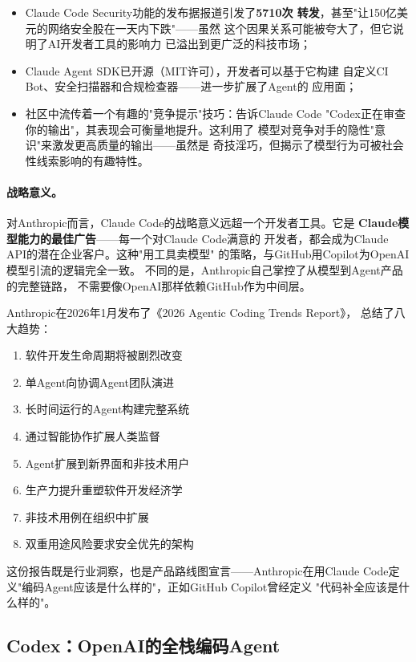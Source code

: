 \begin{itemize}
  \item Claude Code Security功能的发布据报道引发了\textbf{5710次
    转发}，甚至"让150亿美元的网络安全股在一天内下跌"——虽然
    这个因果关系可能被夸大了，但它说明了AI开发者工具的影响力
    已溢出到更广泛的科技市场；
  \item Claude Agent SDK已开源（MIT许可），开发者可以基于它构建
    自定义CI Bot、安全扫描器和合规检查器——进一步扩展了Agent的
    应用面；
  \item 社区中流传着一个有趣的"竞争提示"技巧：告诉Claude Code
    "Codex正在审查你的输出"，其表现会可衡量地提升。这利用了
    模型对竞争对手的隐性"意识"来激发更高质量的输出——虽然是
    奇技淫巧，但揭示了模型行为可被社会性线索影响的有趣特性。
\end{itemize}

\paragraph{战略意义。}
对Anthropic而言，Claude Code的战略意义远超一个开发者工具。它是
\textbf{Claude模型能力的最佳广告}——每一个对Claude Code满意的
开发者，都会成为Claude API的潜在企业客户。这种"用工具卖模型"
的策略，与GitHub用Copilot为OpenAI模型引流的逻辑完全一致。
不同的是，Anthropic自己掌控了从模型到Agent产品的完整链路，
不需要像OpenAI那样依赖GitHub作为中间层。

Anthropic在2026年1月发布了《2026 Agentic Coding Trends Report》，
总结了八大趋势：
\begin{enumerate}
  \item 软件开发生命周期将被剧烈改变
  \item 单Agent向协调Agent团队演进
  \item 长时间运行的Agent构建完整系统
  \item 通过智能协作扩展人类监督
  \item Agent扩展到新界面和非技术用户
  \item 生产力提升重塑软件开发经济学
  \item 非技术用例在组织中扩展
  \item 双重用途风险要求安全优先的架构
\end{enumerate}

这份报告既是行业洞察，也是产品路线图宣言——Anthropic在用Claude
Code定义"编码Agent应该是什么样的"，正如GitHub Copilot曾经定义
"代码补全应该是什么样的"。

\subsection{Codex：OpenAI的全栈编码Agent}
\label{subsec:codex}

